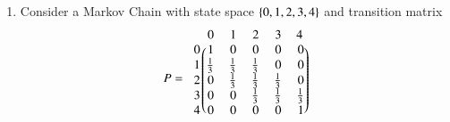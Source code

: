\begin{enumerate}[label=\thesection.\arabic*.,ref=\thesection.\theenumi]
\begin{enumerate}
\end{enumerate}
\item Consider a Markov Chain with state space $\left\{0,1,2,3,4\right\}$ and transition matrix
\begin{align}
P = 
\begin{blockarray}{c@{\hspace{1pt}}rrrrr@{\hspace{3pt}}}
         & 0   & 1   & 2 &3 & 4\\
        \begin{block}{r@{\hspace{3pt}}@{\hspace{1pt}}
    (@{\hspace{1pt}}rrrrr@{\hspace{1pt}}@{\hspace{1pt}})}
        0 & 1 & 0 & 0 & 0 & 0 \\
        1 & \frac{1}{3} & \frac{1}{3} & \frac{1}{3} & 0 & 0 \\
%
        2 & 0 & \frac{1}{3} & \frac{1}{3} & \frac{1}{3} & 0  \\
        3 & 0 & 0 & \frac{1}{3} & \frac{1}{3} & \frac{1}{3}   \\
        4 & 0 & 0 & 0 & 0 & 1 \\
        \end{block}
    \end{blockarray}

\end{align}
\end{enumerate}
